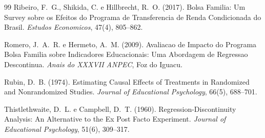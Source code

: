 \documentclass[12pt, a4paper, openany]{book}
\begin{document}
\begin{thebibliography}{99}
Ribeiro, F.~G., Shikida, C. e Hillbrecht, R.~O. (2017).
\newblock Bolsa Familia: Um Survey sobre os Efeitos do Programa de Transferencia de Renda Condicionada do Brasil.
\newblock \textit{Estudos Economicos}, 47(4), 805--862.

Romero, J.~A.~R. e Hermeto, A.~M. (2009).
\newblock Avaliacao de Impacto do Programa Bolsa Familia sobre Indicadores Educacionais: Uma Abordagem de Regressao Descontinua.
\newblock \textit{Anais do XXXVII ANPEC}, Foz do Iguacu.

Rubin, D.~B. (1974).
\newblock Estimating Causal Effects of Treatments in Randomized and Nonrandomized Studies.
\newblock \textit{Journal of Educational Psychology}, 66(5), 688--701.

Thistlethwaite, D.~L. e Campbell, D.~T. (1960).
\newblock Regression-Discontinuity Analysis: An Alternative to the Ex Post Facto Experiment.
\newblock \textit{Journal of Educational Psychology}, 51(6), 309--317.

\end{thebibliography}
\end{document}

